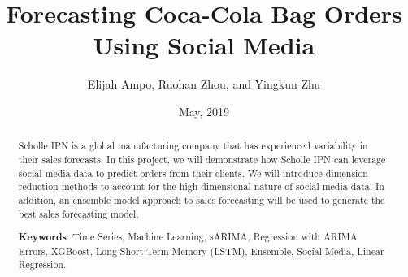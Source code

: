 \documentclass[12pt,oneside]{chicagocapstone}
\title{Forecasting Coca-Cola Bag Orders Using Social Media}
\author{Elijah Ampo, Ruohan Zhou, and Yingkun Zhu}
\date{May, 2019} %
\begin{document}
  \maketitle

\frontmatter %
\pagestyle{empty} %


  \begin{abstract}
    Scholle IPN is a global manufacturing company that has experienced
    variability in their sales forecasts. In this project, we will
    demonstrate how Scholle IPN can leverage social media data to predict
    orders from their clients. We will introduce dimension reduction methods
    to account for the high dimensional nature of social media data. In
    addition, an ensemble model approach to sales forecasting will be used
    to generate the best sales forecasting model.
    
    \bigskip  \bigskip
    \bigskip
    
    \textbf{Keywords}: Time Series, Machine Learning, sARIMA, Regression
    with ARIMA Errors, XGBoost, Long Short-Term Memory (LSTM), Ensemble,
    Social Media, Linear Regression.
    
    \bigskip  \bigskip
    \bigskip
  \end{abstract}
\end{document}

